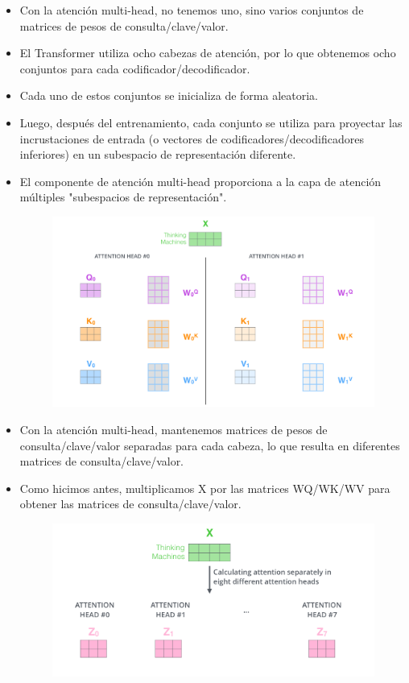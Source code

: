 \begin{itemize}
\item Con la atención multi-head, no tenemos uno, sino varios conjuntos de matrices de pesos de consulta/clave/valor.

\item El Transformer utiliza ocho cabezas de atención, por lo que obtenemos ocho conjuntos para cada codificador/decodificador.

\item Cada uno de estos conjuntos se inicializa de forma aleatoria.

\item Luego, después del entrenamiento, cada conjunto se utiliza para proyectar las incrustaciones de entrada (o vectores de codificadores/decodificadores inferiores) en un subespacio de representación diferente.

\item El componente de atención multi-head proporciona a la capa de atención múltiples "subespacios de representación".

\begin{figure}[h]
  \centering
  \includegraphics[scale=0.2]{pics/transformer_attention_heads_qkv.png}
\end{figure}

\item Con la atención multi-head, mantenemos matrices de pesos de consulta/clave/valor separadas para cada cabeza, lo que resulta en diferentes matrices de consulta/clave/valor.

\item Como hicimos antes, multiplicamos X por las matrices WQ/WK/WV para obtener las matrices de consulta/clave/valor.

\begin{figure}[h]
  \centering
  \includegraphics[scale=0.25]{pics/transformer_attention_heads_z.png}
\end{figure}


\end{itemize}
